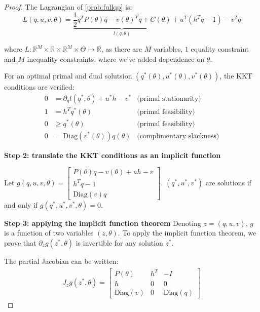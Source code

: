 \begin{proof}
The Lagrangian of \cref{prob:fullqp} is:
\begin{equation}
    L(q, u, v, \theta) = \underbrace{\frac{1}{2}q^TP(\theta)q - v(\theta)^Tq + C(\theta)}_{l(q, \theta)}+ u^T(h^Tq - 1) - v^Tq
\end{equation}

where $L: \mathbb R^M \times \mathbb R \times \mathbb R^M\times\Theta\to\mathbb R$, as there are $M$ variables, $1$ equality constraint and $M$ inequality constraints, where we've added dependence on $\theta$.

For an optimal primal and dual solutsion $(q^*(\theta), u^*(\theta), v^*(\theta))$, the KKT conditions are verified:
\begin{align}
    0 &= \partial_q l(q^*, \theta) + u^*h - v^* &\text{(primal stationarity)}\\
    1 & =h^Tq^*(\theta)  & \text{(primal feasibility)} \\
    0 & \geq q^*(\theta) & \text{(primal feasibility)}\\
    0 & = \mathrm{Diag}(v^*(\theta))q(\theta) & \text{(complimentary slackness)}
\end{align}






\textbf{Step 2: translate the KKT conditions as an implicit function}

Let $g(q, u, v, \theta) = \begin{bmatrix}
    P(\theta)q - v(\theta) + uh - v\\
    h^Tq- 1\\
    \mathrm{Diag}(v)q
\end{bmatrix}$. $(q^*, u^*, v^*)$ are solutions if and only if $g(q^*, u^*, v^*, \theta) = 0$.

\textbf{Step 3: applying the implicit function theorem}
Denoting $z = (q, u, v)$, $g$ is a function of two variables $(z, \theta)$. To apply the implicit function theorem, we prove that $\partial_z g(z^*, \theta)$ is invertible for any solution $z^*$.

The partial Jacobian can be written:
\begin{align}
    J_z g(z^*, \theta) = \begin{bmatrix}
    P(\theta) & h^T & - I\\
    h & 0 & 0\\
    \mathrm{Diag}(v)& 0 & \mathrm{Diag}(q)
    \end{bmatrix}
\end{align}


\end{proof}
